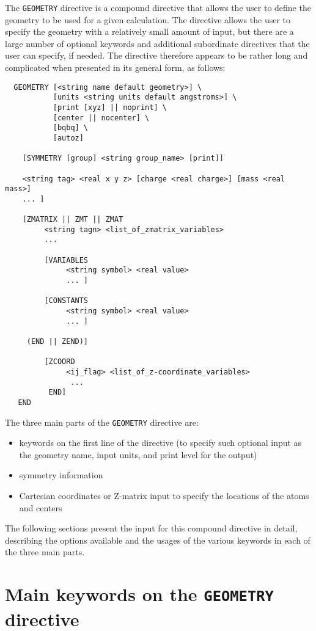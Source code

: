 \label{sec:geom}

The \verb+GEOMETRY+ directive is a compound directive that allows the
user to define the geometry to be used for a given calculation.  The
directive allows the user to specify the geometry with a relatively
small amount of input, but there are a large number of optional
keywords and additional subordinate directives that the user can
specify, if needed.  The directive therefore appears to be rather long
and complicated when presented in its general form, as follows:
\begin{verbatim}
  GEOMETRY [<string name default geometry>] \
           [units <string units default angstroms>] \
           [print [xyz] || noprint] \
           [center || nocenter] \
           [bqbq] \
           [autoz]
    
    [SYMMETRY [group] <string group_name> [print]]

    <string tag> <real x y z> [charge <real charge>] [mass <real mass>]
    ... ]

    [ZMATRIX || ZMT || ZMAT
         <string tagn> <list_of_zmatrix_variables>
         ... 

         [VARIABLES
              <string symbol> <real value>
              ... ]
 
         [CONSTANTS
              <string symbol> <real value>
              ... ]

     (END || ZEND)]

         [ZCOORD
              <ij_flag> <list_of_z-coordinate_variables>
               ...
          END]
   END
\end{verbatim}

The three main parts of the \verb+GEOMETRY+ directive
are:

\begin{itemize}
\item keywords on the first line of the directive (to specify such optional
input as the geometry name, input units, and print level for the output)
\item symmetry information
\item Cartesian coordinates or Z-matrix input to specify the locations 
of the atoms and centers
\end{itemize}

The following sections present the input for this compound directive in
detail, describing the options available and the usages of the various
keywords in each of the three main parts.


\section{Main keywords on the {\tt GEOMETRY} directive}
\label{sec:geomkeys}

